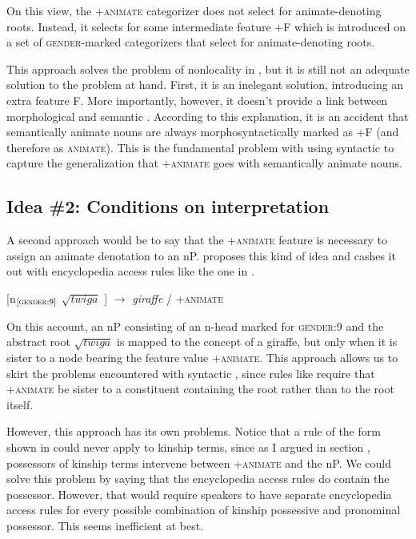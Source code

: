 \documentclass[output=paper,newtxmath,modfonts,nonflat,hidelinks]{langsci/langscibook}
\begin{document}
On this view, the +\textsc{animate} categorizer does not select for animate-denoting roots.  Instead, it selects for some intermediate feature +F which is introduced on a set of \textsc{gender}-marked categorizers that select for animate-denoting roots.  

This approach solves the problem of nonlocality in , but it is still not an adequate solution to the problem at hand.  First, it is an inelegant solution, introducing an extra feature F.  More importantly, however, it doesn't provide a link between morphological  and semantic . According to this explanation, it is an accident that semantically animate nouns are always morphosyntactically marked as +F (and therefore as \textsc{animate}).  This is the fundamental problem with using syntactic  to capture the generalization that +\textsc{animate} goes with semantically animate nouns.  

\subsection{Idea \#2: Conditions on interpretation} \label{sec:pesetsky:conditiononinterp}

A second approach would be to say that the +\textsc{animate} feature is necessary to assign an animate denotation to an nP.  \citet{kramer15} proposes this kind of idea and cashes it out with encyclopedia access rules like the one in .

\ea\label{ex:pesetsky:twiga} [n$_{[\textsc{gender}:9]}$ $\sqrt{twiga}$ ] $\rightarrow$ \textit{giraffe} / +\textsc{animate} \z

On this account, an nP consisting of an n-head marked for \textsc{gender}:9 and the abstract root $\sqrt{twiga}$ is mapped to the concept of a giraffe, but only when it is sister to a node bearing the feature value +\textsc{animate}.  This approach allows us to skirt the  problems encountered with syntactic , since rules like  require that +\textsc{animate} be sister to a constituent containing the root rather than to the root itself.

However, this approach has its own  problems.  Notice that a rule of the form shown in  could never apply to kinship terms, since as I argued in section , possessors of kinship terms intervene between +\textsc{animate} and the nP. We could solve this  problem by saying that the encyclopedia access rules do contain the possessor.  However, that would require  speakers to have separate encyclopedia access rules for every possible combination of kinship possessive and pronominal possessor.  This seems inefficient at best.
\end{document}
